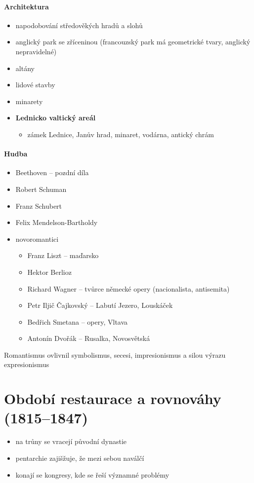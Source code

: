 \paragraph{Architektura}
\begin{itemize}
\item napodobování středověkých hradů a slohů
\item anglický park se zříceninou (francouzský park má geometrické tvary, anglický nepravidelné)
\item altány
\item lidové stavby 
\item minarety
\item \textbf{Lednicko valtický areál}
	\begin{itemize}
	\item zámek Lednice, Janův hrad, minaret, vodárna, antický chrám
	\end{itemize}
\end{itemize}

\paragraph{Hudba}
\begin{itemize}
\item Beethoven -- pozdní díla
\item Robert Schuman
\item Franz Schubert
\item Felix Mendelson-Bartholdy
\item novoromantici
	\begin{itemize}
	\item Franz Liszt -- maďarsko
	\item Hektor Berlioz
	\item Richard Wagner -- tvůrce německé opery (nacionalista, antisemita)
	\item Petr Iljič Čajkovský -- Labutí Jezero, Louskáček
	\item Bedřich Smetana -- opery, Vltava
	\item Antonín Dvořák -- Rusalka, Novosvětská
	\end{itemize}
\end{itemize}

Romantismus ovlivnil symbolismus, secesi, impresionismus a silou výrazu expresionismus




\section{Období restaurace a rovnováhy (1815--1847)}
\begin{itemize}
\item na trůny se vracejí původní dynastie
\item pentarchie zajišžuje, že mezi sebou naválčí
\item konají se kongresy, kde se řeší významné problémy
\end{itemize}

